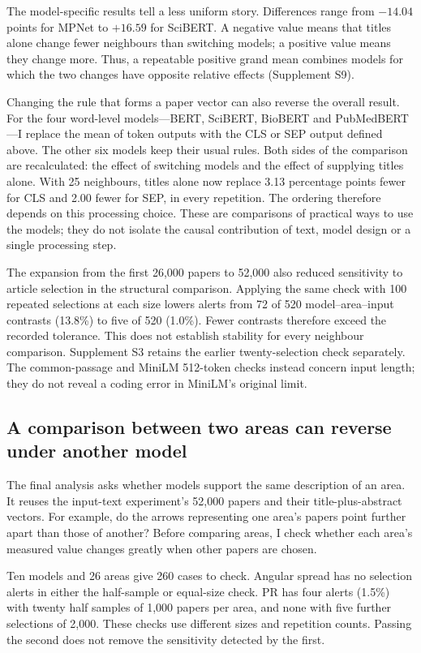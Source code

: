 \documentclass[12pt]{article}
\begin{document}
The model-specific results tell a less uniform story. Differences range from $-14.04$ points for MPNet to $+16.59$ for SciBERT. A negative value means that titles alone change fewer neighbours than switching models; a positive value means they change more. Thus, a repeatable positive grand mean combines models for which the two changes have opposite relative effects (Supplement S9).

Changing the rule that forms a paper vector can also reverse the overall result. For the four word-level models---BERT, SciBERT, BioBERT and PubMedBERT---I replace the mean of token outputs with the CLS or SEP output defined above. The other six models keep their usual rules. Both sides of the comparison are recalculated: the effect of switching models and the effect of supplying titles alone. With 25 neighbours, titles alone now replace 3.13 percentage points fewer for CLS and 2.00 fewer for SEP, in every repetition. The ordering therefore depends on this processing choice. These are comparisons of practical ways to use the models; they do not isolate the causal contribution of text, model design or a single processing step.

The expansion from the first 26,000 papers to 52,000 also reduced sensitivity to article selection in the structural comparison. Applying the same check with 100 repeated selections at each size lowers alerts from 72 of 520 model--area--input contrasts (13.8\%) to five of 520 (1.0\%). Fewer contrasts therefore exceed the recorded tolerance. This does not establish stability for every neighbour comparison. Supplement S3 retains the earlier twenty-selection check separately. The common-passage and MiniLM 512-token checks instead concern input length; they do not reveal a coding error in MiniLM's original limit.

\FloatBarrier
\subsection{A comparison between two areas can reverse under another model}
The final analysis asks whether models support the same description of an area. It reuses the input-text experiment's 52,000 papers and their title-plus-abstract vectors. For example, do the arrows representing one area's papers point further apart than those of another? Before comparing areas, I check whether each area's measured value changes greatly when other papers are chosen.

Ten models and 26 areas give 260 cases to check. Angular spread has no selection alerts in either the half-sample or equal-size check. PR has four alerts (1.5\%) with twenty half samples of 1,000 papers per area, and none with five further selections of 2,000. These checks use different sizes and repetition counts. Passing the second does not remove the sensitivity detected by the first.
\end{document}
